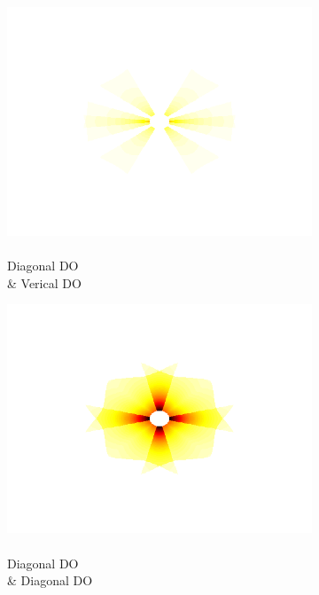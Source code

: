 \documentclass[journal,onecolumn]{IEEEtran}
\begin{document}
\begin{figure}[h]
    \par \bigskip
    \begin{subfigure}[b]{0.2\textwidth}
            \centering
            \captionsetup{justification=centering}
            \includegraphics[width=.85\linewidth]{w_2_1}
            \caption{\\ Diagonal DO \\ \& Verical DO}
    \end{subfigure}%
    \begin{subfigure}[b]{0.2\textwidth}
            \centering
            \captionsetup{justification=centering}
            \includegraphics[width=.85\linewidth]{w_2_2}
            \caption{\\ Diagonal DO \\ \& Diagonal DO}
    \end{subfigure}%
    \begin{subfigure}[b]{0.2\textwidth}
            \centering
            \captionsetup{justification=centering}

\end{subfigure}
\end{figure}
\end{document}
